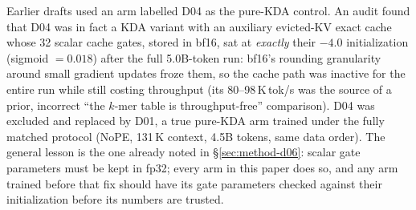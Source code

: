 \documentclass[11pt]{article}
\theoremstyle{plain}
\begin{document}
Earlier drafts used an arm labelled D04 as the pure-KDA control. An audit found that D04 was in
fact a KDA variant with an auxiliary evicted-KV exact cache whose 32 scalar cache gates, stored
in bf16, sat at \emph{exactly} their $-4.0$ initialization (sigmoid $= 0.018$) after the full
5.0B-token run: bf16's rounding granularity around small gradient updates froze them, so the
cache path was inactive for the entire run while still costing throughput (its 80--98\,K\,tok/s
was the source of a prior, incorrect ``the $k$-mer table is throughput-free'' comparison).
D04 was excluded and replaced by D01, a true pure-KDA arm trained under the fully matched
protocol (NoPE, 131\,K context, 4.5B tokens, same data order). The general lesson is the one
already noted in \S\ref{sec:method-d06}: scalar gate parameters must be kept in fp32; every arm
in this paper does so, and any arm trained before that fix should have its gate parameters
checked against their initialization before its numbers are trusted.



\end{document}
